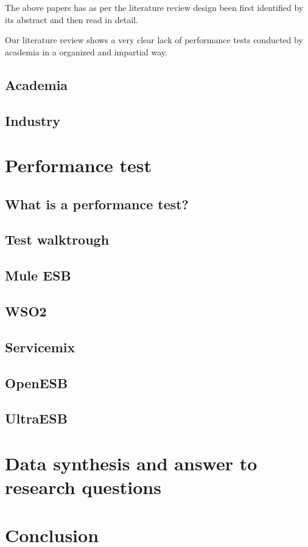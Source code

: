 \documentclass{llncs}
\begin{document}
The above papers has as per the literature review design been first identified by its abstract and then read in detail. 


Our literature review shows a very clear lack of performance tests conducted by academia in a organized and impartial way.


\subsection{Academia}
\subsection{Industry}

\section{Performance test}
\subsection{What is a performance test?}
\subsection{Test walktrough}
	\subsection{Mule ESB}
	\subsection{WSO2}
	\subsection{Servicemix}
	\subsection{OpenESB}
	\subsection{UltraESB}

\section{Data synthesis and answer to research questions}
\section{Conclusion}



\end{document}
